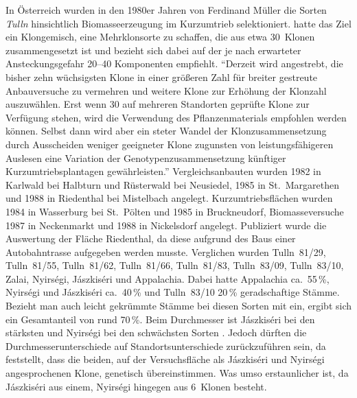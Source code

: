 \documentclass[twocolumn]{scrartcl}
\begin{document}
In Österreich wurden in den 1980er Jahren von Ferdinand Müller die
Sorten \emph{Tulln} hinsichtlich Biomasseerzeugung im Kurzumtrieb
selektioniert. \cite{mueller1999robinie} hatte das Ziel ein
Klongemisch, eine Mehrklonsorte zu schaffen, die aus etwa 30~Klonen
zusammengesetzt ist und bezieht sich dabei auf
\cite{huehn1986klonanazahl} der je nach erwarteter Ansteckungsgefahr
20--40 Komponenten empfiehlt.
\enquote{Derzeit wird angestrebt, die bisher zehn wüchsigsten Klone in
  einer größeren Zahl für breiter gestreute Anbauversuche zu vermehren
  und weitere Klone zur Erhöhung der Klonzahl auszuwählen. Erst wenn
  30 auf mehreren Standorten geprüfte Klone zur Verfügung stehen, wird
  die Verwendung des Pflanzenmaterials empfohlen werden können. Selbst
  dann wird aber ein steter Wandel der Klonzusammensetzung durch
  Ausscheiden weniger geeigneter Klone zugunsten von
  leistungsfähigeren Auslesen eine Variation der
  Genotypenzusammensetzung künftiger Kurzumtriebsplantagen
  gewährleisten.} \citep{mueller1999robinie}
Vergleichsanbauten wurden 1982 in Karlwald bei Halbturn
und Rüsterwald bei Neusiedel, 1985 in St.~Margarethen und 1988 in
Riedenthal bei Mistelbach angelegt. Kurzumtriebsflächen wurden 1984 in
Wasserburg bei St.~Pölten und 1985 in Bruckneudorf, Biomasseversuche
1987 in Neckenmarkt und 1988 in Nickelsdorf angelegt. Publiziert
wurde die Auswertung der Fläche Riedenthal, da diese aufgrund des Baus
einer Autobahntrasse aufgegeben werden musste. Verglichen wurden
Tulln~81/29, Tulln~81/55, Tulln~81/62, Tulln~81/66, Tulln~81/83,
Tulln~83/09, Tulln~83/10, Zalai, Nyirségi, Jászkiséri und
Appalachia. Dabei hatte Appalachia ca.\ 55\,\%, Nyirségi und
Jászkiséri ca.\ 40\,\% und Tulln~83/10 20\,\% geradschaftige Stämme.
Bezieht man auch leicht gekrümmte Stämme bei diesen Sorten mit ein, ergibt sich ein Gesamtanteil von rund 70\,\%.
Beim Durchmesser ist Jászkiséri bei den stärksten
und Nyirségi bei den schwächsten Sorten
\citep{schueler2006robinie}. Jedoch dürften die
Durchmesserunterschiede auf Standortsunterschiede zurückzuführen sein,
da \cite{heinze2014robinie} feststellt, dass die beiden, auf der
Versuchsfläche als Jászkiséri und Nyirségi angesprochenen Klone,
genetisch übereinstimmen. Was umso erstaunlicher ist, da
Jászkiséri aus einem, Nyirségi hingegen aus
6~Klonen besteht.
\end{document}
